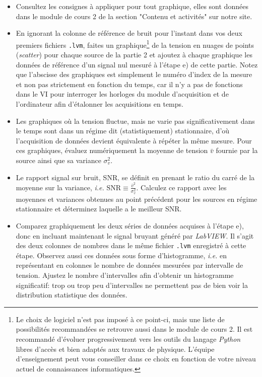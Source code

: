 \documentclass[canadien,12pt,oneside,letterpaper]{article}
\begin{document}
\begin{itemize} \itemsep3pt
    \item Consultez les consignes à appliquer pour tout graphique, elles sont données dans le module de cours 2 de la section "Contenu et activités" sur notre site.
    \item En ignorant la colonne de référence de bruit pour l'instant dans vos deux premiers fichiers \texttt{.lvm}, faites un graphique\footnote{Le choix de logiciel n'est pas imposé à ce point-ci, mais une liste de possibilités recommandées se retrouve aussi dans le module de cours 2. Il est recommandé d'évoluer progressivement vers les outils du langage \textit{Python} libres d'accès et bien adaptés aux travaux de physique. L'équipe d'enseignement peut vous conseiller dans ce choix en fonction de votre niveau actuel de connaissances informatiques.} de la tension en nuages de points (\textit{scatter}) pour chaque source de la partie 2 et ajoutez à chaque graphique les données de référence d'un signal nul mesuré à l'étape e) de cette partie. Notez que l'abscisse des graphiques est simplement le numéro d'index de la mesure et non pas strictement en fonction du temps, car il n'y a pas de fonctions dans le VI pour interroger les horloges du module d'acquisition et de l'ordinateur afin d'étalonner les acquisitions en temps.
    \item Les graphiques où la tension fluctue, mais ne varie pas significativement dans le temps sont dans un régime dit (statistiquement) stationnaire, d'où l'acquisition de données devient équivalente à répéter la même mesure. Pour ces graphiques, évaluez numériquement la moyenne de tension $\bar{v}$ fournie par la source ainsi que sa variance $\sigma_v^2$.
    \item Le rapport signal sur bruit, SNR, se définit en prenant le ratio du carré de la moyenne sur la variance, \textit{i.e.} \(\displaystyle \text{SNR}\equiv \frac{\bar{v}^2}{\sigma_v^2}\). Calculez ce rapport avec les moyennes et variances obtenues au point précédent pour les sources en régime stationnaire et déterminez laquelle a le meilleur SNR.
    \item Comparez graphiquement les deux séries de données acquises à l'étape e), donc en incluant maintenant le signal bruyant généré par \textit{LabVIEW}. Il s'agit des deux colonnes de nombres dans le même fichier \texttt{.lvm} enregistré à cette étape. Observez aussi ces données sous forme d'histogramme, \textit{i.e.} en représentant en colonnes le nombre de données mesurées par intervalle de tension. Ajustez le nombre d'intervalles afin d'obtenir un histogramme significatif: trop ou trop peu d'intervalles ne permettent pas de bien voir la distribution statistique des données.
\end{itemize}
\end{document}
